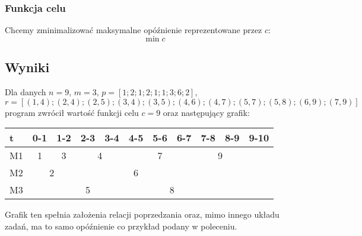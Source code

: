 \documentclass{article}
\theoremstyle{definition}
\theoremstyle{remark}
\theoremstyle{plain}
\theoremstyle{remark}
\theoremstyle{plain}
\begin{document}
\subsubsection{Funkcja celu}
Chcemy zminimalizować maksymalne opóźnienie reprezentowane przez $c$:
\[ \min c \]

\subsection{Wyniki}

Dla danych $n=9$, $m=3$, $p=[1; 2; 1; 2; 1; 1; 3; 6; 2]$, $r=[(1,4);(2,4);(2,5);(3,4);(3,5);(4,6);(4,7);(5,7);(5,8);(6,9);(7,9)]$ program zwrócił wartość funkcji celu $c=9$ oraz następujący grafik:

\begin{table}[H]
\centering
\begin{tabular}{|l|cccccllclc}
\hline
t  & \multicolumn{1}{l|}{0-1}    & \multicolumn{1}{l|}{1-2}    & \multicolumn{1}{l|}{2-3}    & \multicolumn{1}{l|}{3-4} & \multicolumn{1}{l|}{4-5}    & \multicolumn{1}{l|}{5-6} & \multicolumn{1}{l|}{6-7} & \multicolumn{1}{l|}{7-8} & \multicolumn{1}{l|}{8-9} & \multicolumn{1}{l|}{9-10} \\ \hline
M1 & \cellcolor[HTML]{FD6864}1 & \cellcolor[HTML]{FFFE65}3 & \multicolumn{2}{c}{\cellcolor[HTML]{67FD9A}4}      & \multicolumn{3}{c}{\cellcolor[HTML]{9698ED}7}                               & \multicolumn{2}{c}{\cellcolor[HTML]{FCFF2F}9}   &                         \\ \cline{1-1}
M2 & \multicolumn{2}{c}{\cellcolor[HTML]{FE996B}2}         &                           &                        & \cellcolor[HTML]{DAE8FC}6 & \multicolumn{1}{c}{}   & \multicolumn{1}{c}{}   &                        & \multicolumn{1}{c}{}   &                         \\ \cline{1-1}
M3 &                           &                           & \cellcolor[HTML]{38FFF8}5 & \multicolumn{6}{c}{\cellcolor[HTML]{C0C0C0}8}                                                                                                          &                         \\ \cline{1-1}
\end{tabular}
\end{table}

Grafik ten spełnia założenia relacji poprzedzania oraz, mimo innego układu zadań, ma to samo opóźnienie co przykład podany w poleceniu.
\end{document}

